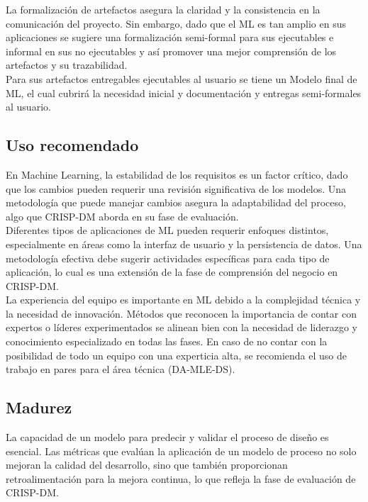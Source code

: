 \documentclass[journal]{IEEEtran}
\begin{document}
La formalización de artefactos asegura la claridad y la consistencia en la comunicación del proyecto. Sin embargo, dado que el ML es tan amplio en sus aplicaciones se sugiere una formalización semi-formal para sus ejecutables e informal en sus no ejecutables y así promover una mejor comprensión de los artefactos y su trazabilidad.\\

Para sus artefactos entregables ejecutables al usuario se tiene un Modelo final de ML, el cual cubrirá la necesidad inicial y documentación y entregas semi-formales al usuario.

\subsection{Uso recomendado}

En Machine Learning, la estabilidad de los requisitos es un factor crítico, dado que los cambios pueden requerir una revisión significativa de los modelos. Una metodología que puede manejar cambios asegura la adaptabilidad del proceso, algo que CRISP-DM aborda en su fase de evaluación.\\

Diferentes tipos de aplicaciones de ML pueden requerir enfoques distintos, especialmente en áreas como la interfaz de usuario y la persistencia de datos. Una metodología efectiva debe sugerir actividades específicas para cada tipo de aplicación, lo cual es una extensión de la fase de comprensión del negocio en CRISP-DM.\\

La experiencia del equipo es importante en ML debido a la complejidad técnica y la necesidad de innovación. Métodos que reconocen la importancia de contar con expertos o líderes experimentados se alinean bien con la necesidad de liderazgo y conocimiento especializado en todas las fases. En caso de no contar con la posibilidad de todo un equipo con una experticia alta, se recomienda el uso de trabajo en pares para el área técnica (DA-MLE-DS).\\

\subsection{Madurez}

La capacidad de un modelo para predecir y validar el proceso de diseño es esencial. Las métricas que evalúan la aplicación de un modelo de proceso no solo mejoran la calidad del desarrollo, sino que también proporcionan retroalimentación para la mejora continua, lo que refleja la fase de evaluación de CRISP-DM.\\
\end{document}
